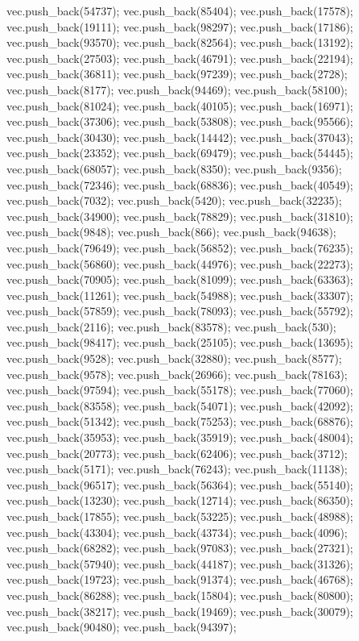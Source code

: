 vec.push_back(54737);
vec.push_back(85404);
vec.push_back(17578);
vec.push_back(19111);
vec.push_back(98297);
vec.push_back(17186);
vec.push_back(93570);
vec.push_back(82564);
vec.push_back(13192);
vec.push_back(27503);
vec.push_back(46791);
vec.push_back(22194);
vec.push_back(36811);
vec.push_back(97239);
vec.push_back(2728);
vec.push_back(8177);
vec.push_back(94469);
vec.push_back(58100);
vec.push_back(81024);
vec.push_back(40105);
vec.push_back(16971);
vec.push_back(37306);
vec.push_back(53808);
vec.push_back(95566);
vec.push_back(30430);
vec.push_back(14442);
vec.push_back(37043);
vec.push_back(23352);
vec.push_back(69479);
vec.push_back(54445);
vec.push_back(68057);
vec.push_back(8350);
vec.push_back(9356);
vec.push_back(72346);
vec.push_back(68836);
vec.push_back(40549);
vec.push_back(7032);
vec.push_back(5420);
vec.push_back(32235);
vec.push_back(34900);
vec.push_back(78829);
vec.push_back(31810);
vec.push_back(9848);
vec.push_back(866);
vec.push_back(94638);
vec.push_back(79649);
vec.push_back(56852);
vec.push_back(76235);
vec.push_back(56860);
vec.push_back(44976);
vec.push_back(22273);
vec.push_back(70905);
vec.push_back(81099);
vec.push_back(63363);
vec.push_back(11261);
vec.push_back(54988);
vec.push_back(33307);
vec.push_back(57859);
vec.push_back(78093);
vec.push_back(55792);
vec.push_back(2116);
vec.push_back(83578);
vec.push_back(530);
vec.push_back(98417);
vec.push_back(25105);
vec.push_back(13695);
vec.push_back(9528);
vec.push_back(32880);
vec.push_back(8577);
vec.push_back(9578);
vec.push_back(26966);
vec.push_back(78163);
vec.push_back(97594);
vec.push_back(55178);
vec.push_back(77060);
vec.push_back(83558);
vec.push_back(54071);
vec.push_back(42092);
vec.push_back(51342);
vec.push_back(75253);
vec.push_back(68876);
vec.push_back(35953);
vec.push_back(35919);
vec.push_back(48004);
vec.push_back(20773);
vec.push_back(62406);
vec.push_back(3712);
vec.push_back(5171);
vec.push_back(76243);
vec.push_back(11138);
vec.push_back(96517);
vec.push_back(56364);
vec.push_back(55140);
vec.push_back(13230);
vec.push_back(12714);
vec.push_back(86350);
vec.push_back(17855);
vec.push_back(53225);
vec.push_back(48988);
vec.push_back(43304);
vec.push_back(43734);
vec.push_back(4096);
vec.push_back(68282);
vec.push_back(97083);
vec.push_back(27321);
vec.push_back(57940);
vec.push_back(44187);
vec.push_back(31326);
vec.push_back(19723);
vec.push_back(91374);
vec.push_back(46768);
vec.push_back(86288);
vec.push_back(15804);
vec.push_back(80800);
vec.push_back(38217);
vec.push_back(19469);
vec.push_back(30079);
vec.push_back(90480);
vec.push_back(94397);
